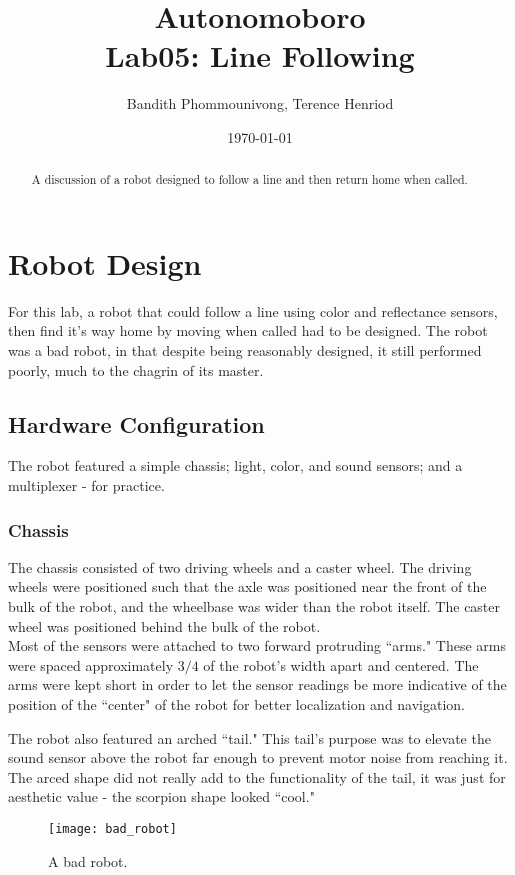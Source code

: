 \documentclass{article}
\title{Autonomoboro \\ Lab05: Line Following}
\author{Bandith Phommounivong, Terence Henriod}
\date{\today}
\begin{document}
\maketitle

\begin{abstract}
A discussion of a robot designed to follow a line and then return home when called.
\end{abstract}

\newpage
\section{Robot Design}
For this lab, a robot that could follow a line using color and reflectance sensors, then find it's way home by moving when called had to be designed. The robot was a bad robot, in that despite being reasonably designed, it still performed poorly, much to the chagrin of its master.

\subsection{Hardware Configuration}
The robot featured a simple chassis; light, color, and sound sensors; and a multiplexer - for practice.

\subsubsection{Chassis}
The chassis consisted of two driving wheels and a caster wheel. The driving wheels were positioned such that the axle was positioned near the front of the bulk of the robot, and the wheelbase was wider than the robot itself. The caster wheel was positioned behind the bulk of the robot. \\

Most of the sensors were attached to two forward protruding ``arms." These arms were spaced approximately $3/4$ of the robot's width apart and centered. The arms were kept short in order to let the sensor readings be more indicative of the position of the ``center" of the robot for better localization and navigation.

The robot also featured an arched ``tail." This tail's purpose was to elevate the sound sensor above the robot far enough to prevent motor noise from reaching it. The arced shape did not really add to the functionality of the tail, it was just for aesthetic value - the scorpion shape looked ``cool."

	\begin{figure}[h!]
	\centering
	\texttt{[image: bad\_robot]}
	\caption{A bad robot.}
	\label{fig:bad_robot}
	\end{figure}
\end{document}
